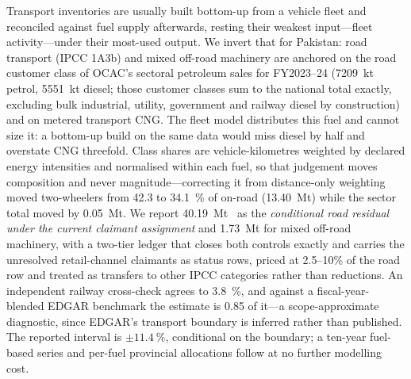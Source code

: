 Transport inventories are usually built bottom-up from a vehicle fleet and reconciled
against fuel supply afterwards, resting their weakest input---fleet activity---under their
most-used output. We invert that for Pakistan: road transport (IPCC 1A3b) and mixed
off-road machinery are anchored on the road customer class of OCAC's sectoral petroleum
sales for FY2023--24 (\SI{7209}{\kilo\tonne} petrol, \SI{5551}{\kilo\tonne} diesel; those
customer classes sum to the national total exactly, excluding bulk industrial, utility,
government and railway diesel by construction) and on metered transport CNG. The fleet
model distributes this fuel and cannot size it: a bottom-up build on the same data would
miss diesel by half and overstate CNG threefold. Class shares are vehicle-kilometres
weighted by declared energy intensities and normalised within each fuel, so that judgement
moves composition and never magnitude---correcting it from distance-only weighting moved
two-wheelers from \SI{42.3}{} to \SI{34.1}{\percent} of on-road \COtwo{}
(\SI{13.40}{\mega\tonne}) while the sector total
moved by \SI{0.05}{\mega\tonne}. We report \SI{40.19}{\mega\tonne}~\COe{} as the
\emph{conditional road residual under the current claimant assignment} and
\SI{1.73}{\mega\tonne} for mixed off-road machinery, with a two-tier ledger that closes
both controls exactly and carries the unresolved retail-channel claimants as status rows,
priced at 2.5--10\% of the road row and treated as transfers to other IPCC categories
rather than reductions. An independent railway cross-check agrees to \SI{3.8}{\percent},
and against a fiscal-year-blended EDGAR benchmark the estimate is \num{0.85} of
it---a scope-approximate diagnostic, since EDGAR's transport boundary is inferred
rather than published. The
reported interval is $\pm\SI{11.4}{\percent}$, conditional on the boundary; a ten-year
fuel-based series and per-fuel provincial allocations follow at no further modelling cost.
